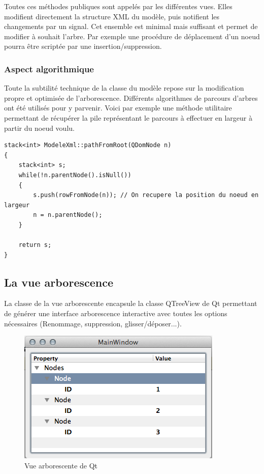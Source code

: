 Toutes ces méthodes publiques sont appelés par les différentes vues.
Elles modifient directement la structure XML du modèle, puis notifient les changements par un signal.
Cet ensemble est minimal mais suffisant et permet de modifier à souhait l'arbre.
Par exemple une procédure de déplacement d'un noeud pourra être scriptée par une insertion/suppression.

\subsubsection{Aspect algorithmique}
Toute la subtilité technique de la classe du modèle repose sur la modification propre et optimisée de l'arborescence.
Différents algorithmes de parcours d'arbres ont été utilisés pour y parvenir. Voici par exemple une méthode utilitaire permettant de récupérer la pile représentant le parcours à effectuer en largeur à partir du noeud voulu.

\begin{lstlisting}
stack<int> ModeleXml::pathFromRoot(QDomNode n)
{
    stack<int> s;
    while(!n.parentNode().isNull())
    {
        s.push(rowFromNode(n)); // On recupere la position du noeud en largeur
        n = n.parentNode();
    }

    return s;
}
\end{lstlisting}

\subsection{La vue arborescence}

La classe de la vue arborescente encapsule la classe QTreeView de Qt permettant de générer une interface arborescence
interactive avec toutes les options nécessaires (Renommage, suppression, glisser/déposer...).

\begin{figure}[h!]
\begin{minipage}[b]{\linewidth}
\centering \includegraphics[scale=0.5]{images/arbo.png}
\caption{Vue arborescente de Qt}
\label{arbo}
\end{minipage}
\end{figure}

